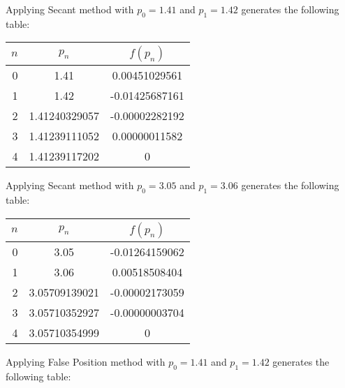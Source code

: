 \documentclass[../../../../Assignments]{subfiles}
\begin{document}
\begin{solution}
\begin{enumerate}[label = \alph*)]
            Applying Secant method with \(p_0 = \num{1.41}\) and \(p_1 =
            \num{1.42}\) generates the following table:

            \begin{table}[H]
                \centering
                \begin{tabular}{r S[table-format=1.11] S[table-format=-1.11]}
                    \toprule
                    \(n\)  &    {\(p_n\)}    &   {\(f(p_n)\)}   \\
                      &  1.41           &   0.00451029561  \\
                        1  &  1.42           &  -0.01425687161  \\
                        2  &  1.41240329057  &  -0.00002282192  \\
                        3  &  1.41239111052  &   0.00000011582  \\
                        4  &  1.41239117202  &   0              \\
                    \bottomrule
                \end{tabular}
            \end{table}

            Applying Secant method with \(p_0 = \num{3.05}\) and \(p_1 =
            \num{3.06}\) generates the following table:

            \begin{table}[H]
                \centering
                \begin{tabular}{r S[table-format=1.11] S[table-format=-1.11]}
                    \toprule
                    \(n\)  &    {\(p_n\)}    &   {\(f(p_n)\)}   \\
                      &  3.05           &  -0.01264159062  \\
                        1  &  3.06           &   0.00518508404  \\
                        2  &  3.05709139021  &  -0.00002173059  \\
                        3  &  3.05710352927  &  -0.00000003704  \\
                        4  &  3.05710354999  &   0              \\
                    \bottomrule
                \end{tabular}
            \end{table}

            Applying False Position method with \(p_0 = \num{1.41}\) and \(p_1 =
            \num{1.42}\) generates the following table:


\end{enumerate}
\end{solution}
\end{document}
